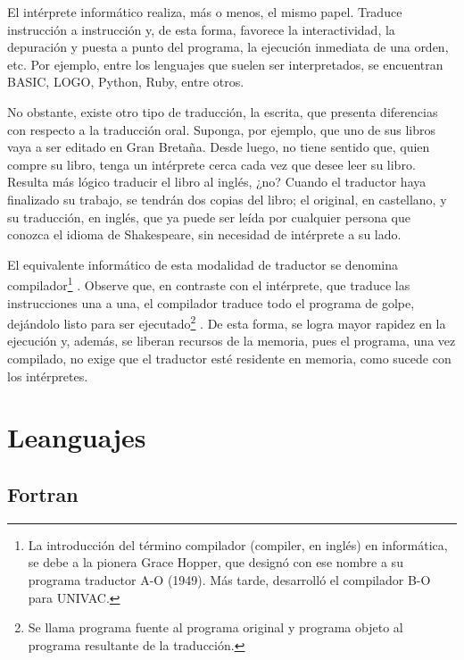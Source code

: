 \documentclass[twoside,twocolumn]{article}
\begin{document}
El intérprete informático realiza, más o menos, el
mismo papel. Traduce instrucción a instrucción y, de
esta forma, favorece la interactividad, la depuración y
puesta a punto del programa, la ejecución inmediata
de una orden, etc. Por ejemplo, entre los lenguajes que
suelen ser interpretados, se encuentran BASIC, LOGO, Python, Ruby, entre otros.

No obstante, existe otro tipo de traducción, la escrita, que presenta diferencias con respecto a la traducción oral. Suponga, por ejemplo, que uno de sus libros
vaya a ser editado en Gran Bretaña. Desde luego, no
tiene sentido que, quien compre su libro, tenga un
intérprete cerca cada vez que desee leer su libro. Resulta más lógico traducir el libro al inglés, ¿no? Cuando el
traductor haya finalizado su trabajo, se tendrán dos
copias del libro; el original, en castellano, y su traducción, en inglés, que ya puede ser leída por cualquier
persona que conozca el idioma de Shakespeare, sin
necesidad de intérprete a su lado.

El equivalente informático de esta modalidad de
traductor se denomina compilador\footnote{La introducción del término compilador (compiler, en inglés) en informática, se debe a la pionera Grace Hopper, que designó con ese nombre a su programa traductor A-O (1949). Más tarde, desarrolló el compilador B-O para UNIVAC.} . Observe que, en
contraste con el intérprete, que traduce las instrucciones una a una, el compilador traduce todo el programa
de golpe, dejándolo listo para ser ejecutado\footnote{Se llama programa fuente al programa original y programa objeto al programa resultante de la traducción.} . De esta
forma, se logra mayor rapidez en la ejecución y, además, se liberan recursos de la memoria, pues el programa, una vez compilado, no exige que el traductor esté
residente en memoria, como sucede con los intérpretes\cite{vicenteHistoria}.







\section{Leanguajes}

\subsection{Fortran}
\end{document}
